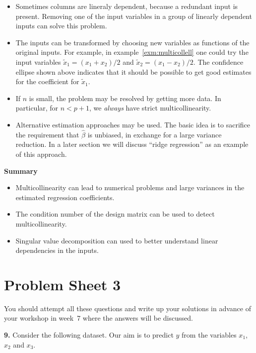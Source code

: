 \documentclass[
  a4paper,
]{article}
\providecommand{\tightlist}{%
  \setlength{\itemsep}{0pt}\setlength{\parskip}{0pt}}
\theoremstyle{definition}
\theoremstyle{definition}
\theoremstyle{definition}
\theoremstyle{definition}
\theoremstyle{remark}
\begin{document}
\begin{itemize}
\item
  Sometimes columns are lineraly dependent, because a redundant input
  is present. Removing one of the input variables in a group
  of linearly dependent inputs can solve this problem.
\item
  The inputs can be transformed by choosing new variables as functions
  of the original inputs. For example, in example~\ref{exm:multicollell}
  one could try the input variables \(\tilde x_1 = (x_1 + x_2) / 2\) and
  \(\tilde x_2 = (x_1 - x_2) / 2\). The confidence ellipse shown above
  indicates that it should be possible to get good estimates for the
  coefficient for \(\tilde x_1\).
\item
  If \(n\) is small, the problem may be resolved by getting more data.
  In particular, for \(n < p+1\), we \emph{always} have strict multicollinearity.
\item
  Alternative estimation approaches may be used. The basic idea is to sacrifice the
  requirement that \(\hat\beta\) is unbiased, in exchange for a large variance
  reduction. In a later section we will discuss ``ridge regression'' as an
  example of this approach.
\end{itemize}

\textbf{Summary}

\begin{itemize}
\tightlist
\item
  Multicollinearity can lead to numerical problems and large variances in the
  estimated regression coefficients.
\item
  The condition number of the design matrix can be used to detect
  multicollinearity.
\item
  Singular value decomposition can used to better understand linear
  dependencies in the inputs.
\end{itemize}

\clearpage

\hypertarget{P03}{%
\section*{Problem Sheet 3}\label{P03}}

You should attempt all these questions and write up your solutions in advance
of your workshop in week~7 where the answers will be discussed.

\textbf{9.} Consider the following dataset. Our aim is to predict \(y\) from the
variables \(x_1\), \(x_2\) and \(x_3\).
\end{document}
